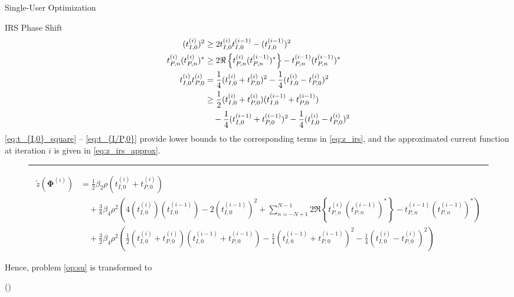 \documentclass{IEEEtran}
\begin{document}
\begin{section}{Single-User Optimization}
\begin{subsection}{IRS Phase Shift}
\begin{align}
			(t_{I,0}^{(i)})^2
			& \ge 2 t_{I,0}^{(i)}t_{I,0}^{(i-1)} - (t_{I,0}^{(i-1)})^2\label{eq:t_{I,0}_square}\\
			t_{P,n}^{(i)} (t_{P,n}^{(i)})^*
			& \ge 2 \Re\left\{t_{P,n}^{(i)} (t_{P,n}^{(i-1)})^*\right\} - t_{P,n}^{(i-1)} (t_{P,n}^{(i-1)})^*\\
			t_{I,0}^{(i)} t_{P,0}^{(i)}
			& = \frac{1}{4}(t_{I,0}^{(i)} + t_{P,0}^{(i)})^2 - \frac{1}{4}(t_{I,0}^{(i)} - t_{P,0}^{(i)})^2\nonumber\\
			& \ge \frac{1}{2}(t_{I,0}^{(i)} + t_{P,0}^{(i)})(t_{I,0}^{(i-1)} + t_{P,0}^{(i-1)})\nonumber\\
			& \quad - \frac{1}{4}(t_{I,0}^{(i-1)} + t_{P,0}^{(i-1)})^2 - \frac{1}{4}(t_{I,0}^{(i)} - t_{P,0}^{(i)})^2\label{eq:t_{I/P,0}}
		\end{align}
		\ref{eq:t_{I,0}_square} -- \ref{eq:t_{I/P,0}} provide lower bounds to the corresponding terms in \ref{eq:z_irs}, and the approximated current function at iteration $i$ is given in \ref{eq:z_irs_approx}.
		\begin{figure*}[b]
			\hrule
			\begin{equation}\label{eq:z_irs_approx}
				\begin{split}
					\tilde{z}(\boldsymbol{\Phi}^{(i)})
					& = \frac{1}{2}{\beta_2}{\rho}(t_{I,0}^{(i)}+t_{P,0}^{(i)})\\
					& \quad + \frac{3}{8}{\beta_4}{\rho^2} \left(4 (t_{I,0}^{(i)})(t_{I,0}^{(i-1)}) - 2 (t_{I,0}^{(i-1)})^2 + \sum_{n=-N+1}^{N-1}{2 \Re\left\{t_{P,n}^{(i)} (t_{P,n}^{(i-1)})^*\right\} - t_{P,n}^{(i-1)} (t_{P,n}^{(i-1)})^*}\right)\\
					& \quad + \frac{3}{2}{\beta_4}{\rho^2} \left(\frac{1}{2}(t_{I,0}^{(i)} + t_{P,0}^{(i)})(t_{I,0}^{(i-1)} + t_{P,0}^{(i-1)}) - \frac{1}{4}(t_{I,0}^{(i-1)} + t_{P,0}^{(i-1)})^2 - \frac{1}{4}(t_{I,0}^{(i)} - t_{P,0}^{(i)})^2\right)
				\end{split}
			\end{equation}
		\end{figure*}
		Hence, problem \ref{op:su} is transformed to
		\begin{maxi!}
				{\boldsymbol{\boldsymbol{\Phi}}}{(\boldsymbol{\Phi})}{\label{op:su_irs}}{\label{eq:su_irs_target}}

\end{maxi!}
\end{subsection}
\end{section}
\end{document}
